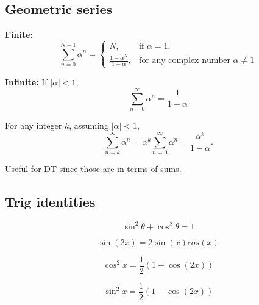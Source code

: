 \subsection{Geometric series}
\begin{definition}

    \textbf{Finite:}
    \begin{equation}
        \sum_{n=0}^{N-1} \alpha^n =
        \begin{cases}
        N, & \text{if } \alpha = 1, \\
        \frac{1 - \alpha^N}{1 - \alpha}, & \text{for any complex number } \alpha \neq 1
        \end{cases}
    \end{equation}

    \textbf{Infinite:} If $|\alpha| < 1,$
    \begin{equation}
        \sum_{n=0}^{\infty} \alpha^n = \frac{1}{1 - \alpha}
    \end{equation}

    For any integer \( k \), assuming \( |\alpha| < 1 \),
    \begin{equation}
        \sum_{n=k}^{\infty} \alpha^n = \alpha^k \sum_{n=0}^{\infty} \alpha^n = \frac{\alpha^k}{1 - \alpha}.
    \end{equation}
\end{definition}

\begin{intuition}
    Useful for DT since those are in terms of sums.
\end{intuition}

\subsection{Trig identities}
\begin{definition}
    \begin{equation}
        \sin^2 \theta + \cos^2 \theta = 1
    \end{equation}

    \begin{equation}
        \sin(2x) = 2\sin(x)cos(x)
    \end{equation}

    \begin{equation}
        \cos^2 x = \frac{1}{2} (1 + \cos(2x))
    \end{equation}

    \begin{equation}
        \sin^2 x = \frac{1}{2} (1 - \cos(2x))
    \end{equation}
\end{definition}